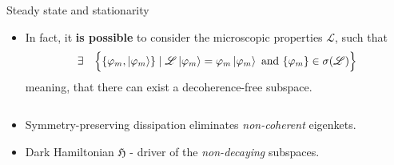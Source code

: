 \documentclass[10pt,xcolor={table,dvipsnames},t]{beamer}
\begin{document}
\begin{frame}{Steady state and stationarity}
      \begin{itemize}
        \item<1-> In fact, it \textbf{is possible} to consider the microscopic properties $\mathcal{L}$, such that
          $$\exists \quad \Bigl\{ \{\varphi_m, \ket{\varphi_m}\} \; \vert \; \mathcal{L}\ket{\varphi_m}=\varphi_m \ket{\varphi_m} \text{ and } \{\varphi_m\}\in \sigma(\mathcal{L})  \Bigr\} $$
          meaning, that there can exist a decoherence-free subspace.
      \end{itemize}
          \begin{columns}
            \begin{column}{0.75\textwidth}
              \begin{itemize}
                \item<3-> Symmetry-preserving dissipation eliminates \textit{non-coherent}
                  eigenkets.
                \item<3-> Dark Hamiltonian $\mathfrak{H}$ - driver of the \textit{non-decaying}
                  subspaces. 
              \end{itemize}
            \end{column}
            \begin{column}{0.25\textwidth}
\end{column}
\end{columns}
\end{frame}
\end{document}
